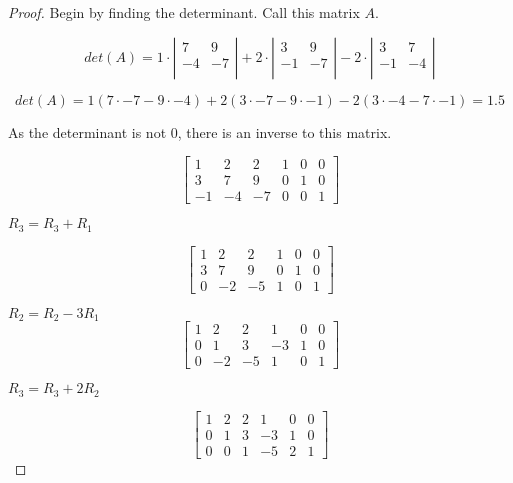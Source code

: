 \documentclass[8pt]{article}
\begin{document}
\begin{proof}
Begin by finding the determinant. Call this matrix $A$. 

\[det(A) =1 \cdot \left| \begin{array}{ccc}7 & 9 \\-4 & -7  \\\end{array}\right| + 2\cdot \left|\begin{array}{ccc}3 & 9 \\-1 & -7  \\\end{array}\right| - 2 \cdot \left| \begin{array}{ccc}3 & 7 \\-1 & -4  \\\end{array} \right|\]

\[det(A) = 1(7\cdot -7 - 9\cdot -4) + 2(3\cdot -7 - 9\cdot -1) - 2(3\cdot -4 - 7\cdot -1) = 1.5\]

As the determinant is not $0$, there is an inverse to this matrix. 


\[\left[\begin{array}{ccc|ccc}  
1 & 2 & 2 & 1 & 0 & 0 \\  
3 & 7 & 9 & 0 & 1 & 0  \\
-1 & -4 & -7 & 0 & 0 & 1  
\end{array} \right]\]

$R_3 = R_3 + R_1$

\[\left[\begin{array}{ccc|ccc}  
1 & 2 & 2 & 1 & 0 & 0 \\  
3 & 7 & 9 & 0 & 1 & 0  \\
0 & -2 & -5 & 1 & 0 & 1  
\end{array} \right]\]

$R_2 = R_2 -3R_1$
\[\left[\begin{array}{ccc|ccc}  
1 & 2 & 2 & 1 & 0 & 0 \\  
0 & 1 & 3 & -3 & 1 & 0  \\
0 & -2 & -5 & 1 & 0 & 1  
\end{array} \right]\]

$R_3 = R_3 + 2R_2$

\[\left[\begin{array}{ccc|ccc}  
1 & 2 & 2 & 1 & 0 & 0 \\  
0 & 1 & 3 & -3 & 1 & 0  \\
0 & 0 & 1 & -5 & 2 & 1  
\end{array} \right]\]



\end{proof}
\end{document}
